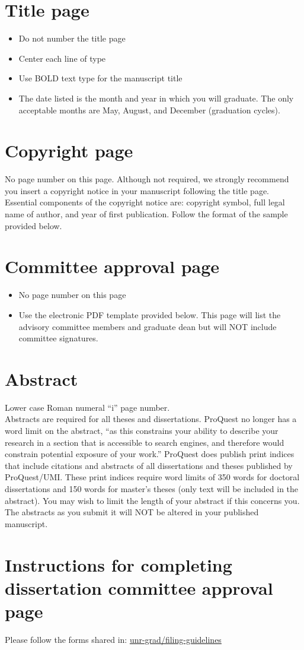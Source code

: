 \section{Title page}
\begin{itemize}
    \item Do not number the title page
    \item Center each line of type
    \item Use BOLD text type for the manuscript title
    \item The date listed is the month and year in which you will graduate. The only acceptable months are May, August, and December (graduation cycles).
\end{itemize}

\section{Copyright page}
No page number on this page. Although not required, we strongly recommend you insert a copyright notice in your manuscript following the title page. Essential components of the copyright notice are: copyright symbol, full legal name of author, and year of first publication. Follow the format of the sample provided below.

\section{Committee approval page}
\begin{itemize}
    \item No page number on this page
    \item Use the electronic PDF template provided below. This page will list the advisory committee members and graduate dean but will NOT include committee signatures.
\end{itemize}

\section{Abstract}
Lower case Roman numeral ``i'' page number. \\

Abstracts are required for all theses and dissertations. ProQuest no longer has a word limit on the abstract, ``as this constrains your ability to describe your research in a section that is accessible to search engines, and therefore would constrain potential exposure of your work.'' ProQuest does publish print indices that include citations and abstracts of all dissertations and theses published by ProQuest/UMI. These print indices require word limits of 350 words for doctoral dissertations and 150 words for master’s theses (only text will be included in the abstract). You may wish to limit the length of your abstract if this concerns you. The abstracts as you submit it will NOT be altered in your published manuscript.

\section{Instructions for completing dissertation committee approval page}
Please follow the forms shared in: \href{https://www.unr.edu/grad/student-resources/filing-guidelines}{unr-grad/filing-guidelines}